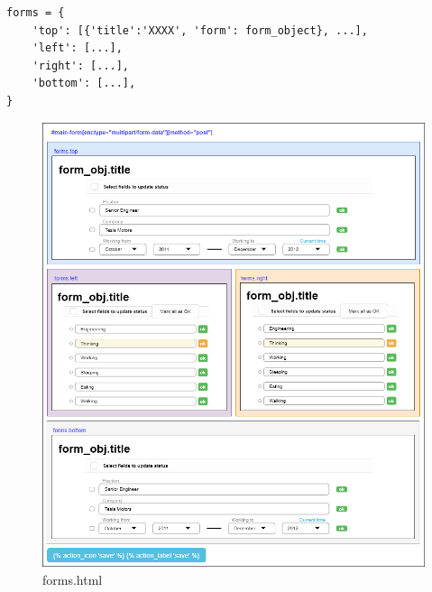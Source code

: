 \begin{lstlisting}
forms = {
	'top': [{'title':'XXXX', 'form': form_object}, ...],
	'left': [...],
	'right': [...],
	'bottom': [...],
}
\end{lstlisting}

\begin{figure}
	\centering
	\includegraphics[scale=0.65]{./diagram/forms_html}
	\caption{forms.html}
\end{figure}
